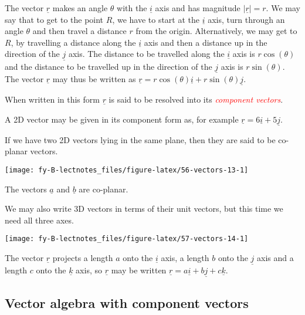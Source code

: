 \documentclass[
  11pt,
  oneside]{book}
\newcommand{\slide}{}
\theoremstyle{definition}
\theoremstyle{definition}
\theoremstyle{definition}
\theoremstyle{definition}
\theoremstyle{remark}
\begin{document}
\slide

The vector \(\underline r\) makes an angle \(\theta\) with the \(\underline i\) axis and has magnitude \(|\underline r| = r\). We may say that to get to the point \(R\), we have to start at the \(\underline i\) axis, turn through an angle \(\theta\) and then travel a distance \(r\) from the origin. Alternatively, we may get to \(R\), by travelling a distance along the \(\underline i\) axis and then a distance up in the direction of the \(\underline j\) axis. The distance to be travelled along the \(\underline i\) axis is \(r\cos(\theta)\) and the distance to be travelled up in the direction of the \(\underline j\) axis is \(r\sin(\theta)\). The vector \(\underline r\) may thus be written as \(\underline r = r\cos(\theta) \underline i + r\sin(\theta)\underline j\).

When written in this form \(\underline r\) is said to be resolved into its \textcolor{red}{\em component vectors}.

\slide

A 2D vector may be given in its component form as, for example \(\underline r = 6\underline i + 5\underline j\).

If we have two 2D vectors lying in the same plane, then they are said to be co-planar vectors.

\begin{center}\texttt{[image: fy-B-lectnotes\_files/figure-latex/56-vectors-13-1]} \end{center}

The vectors \(\underline a\) and \(\underline b\) are co-planar.

\slide

We may also write 3D vectors in terms of their unit vectors, but this time we need all three axes.

\begin{center}\texttt{[image: fy-B-lectnotes\_files/figure-latex/57-vectors-14-1]} \end{center}

The vector \(\underline r\) projects a length \(a\) onto the \(\underline i\) axis, a length \(b\) onto the \(\underline j\) axis and a length \(c\) onto the \(\underline k\) axis, so \(\underline r\) may be written \(\underline r = a\underline i + b\underline j + c\underline k\).

\slide

\subsection{Vector algebra with component vectors}\label{vector-algebra-with-component-vectors}
\end{document}
